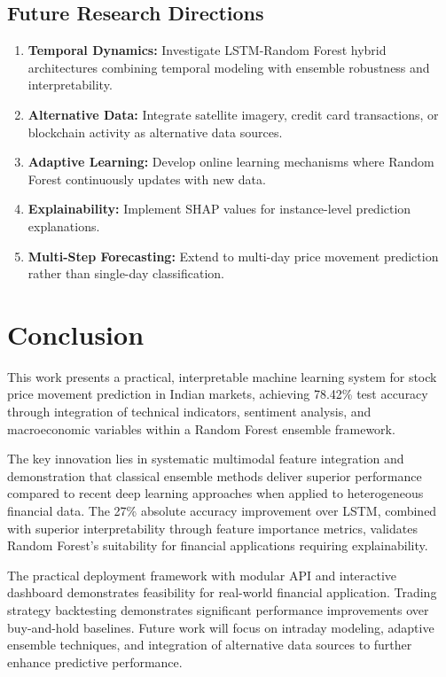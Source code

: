 \documentclass[conference]{IEEEtran}
\begin{document}
\subsection{Future Research Directions}

\begin{enumerate}
\item \textbf{Temporal Dynamics:} Investigate LSTM-Random Forest hybrid architectures combining temporal modeling with ensemble robustness and interpretability.

\item \textbf{Alternative Data:} Integrate satellite imagery, credit card transactions, or blockchain activity as alternative data sources.

\item \textbf{Adaptive Learning:} Develop online learning mechanisms where Random Forest continuously updates with new data.

\item \textbf{Explainability:} Implement SHAP values for instance-level prediction explanations.

\item \textbf{Multi-Step Forecasting:} Extend to multi-day price movement prediction rather than single-day classification.
\end{enumerate}

\section{Conclusion}

This work presents a practical, interpretable machine learning system for stock price movement prediction in Indian markets, achieving 78.42\% test accuracy through integration of technical indicators, sentiment analysis, and macroeconomic variables within a Random Forest ensemble framework. 

The key innovation lies in systematic multimodal feature integration and demonstration that classical ensemble methods deliver superior performance compared to recent deep learning approaches when applied to heterogeneous financial data. The 27\% absolute accuracy improvement over LSTM, combined with superior interpretability through feature importance metrics, validates Random Forest's suitability for financial applications requiring explainability.

The practical deployment framework with modular API and interactive dashboard demonstrates feasibility for real-world financial application. Trading strategy backtesting demonstrates significant performance improvements over buy-and-hold baselines. Future work will focus on intraday modeling, adaptive ensemble techniques, and integration of alternative data sources to further enhance predictive performance.
\end{document}
